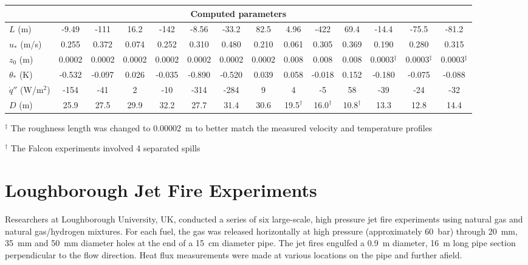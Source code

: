 \begin{table}
\begin{center}
\begin{tabular}{|l|c|c|c|c|c|c|c|c|c|c|c|c|c|}
\multicolumn{14}{|c|}{Computed parameters} \\ \hline
$L$ (m)                        & -9.49  & -111   & 16.2   & -142   & -8.56  & -33.2  & 82.5        & 4.96        & -422        & 69.4              & -14.4           & -75.5          & -81.2   \\ \hline
$u_*$ (m/s)                    & 0.255  & 0.372  & 0.074  & 0.252  & 0.310  & 0.480  & 0.210       & 0.061       & 0.305       & 0.369             & 0.190           & 0.280          & 0.315   \\ \hline
$z_0$ (m)                      & 0.0002 & 0.0002 & 0.0002 & 0.0002 & 0.0002 & 0.0002 & 0.0002      & 0.008       & 0.008       & 0.008             & 0.0003$^\ddag$  & 0.0003$^\ddag$ & 0.0003$^\ddag$  \\ \hline
$\theta_*$ (K)                 & -0.532 & -0.097 & 0.026  & -0.035 & -0.890 & -0.520 & 0.039       & 0.058       & -0.018      & 0.152             & -0.180          & -0.075         & -0.088  \\ \hline
$\dot{q}''$ (W/m$^2$)          & -154   & -41    & 2      & -10    & -314   & -284   & 9           & 4           & -5          & 58                & -39             & -24            & -32     \\ \hline
$D$ (m)                        & 25.9   & 27.5   & 29.9   & 32.2   & 27.7   & 31.4   & 30.6        & 19.5$^\dag$ & 16.0$^\dag$ & 10.8$^\dag$       & 13.3            & 12.8           & 14.4    \\ \hline
\end{tabular}
\end{center}
$^\ddag$ The roughness length was changed to 0.00002~m to better match the measured velocity and temperature profiles

$^\dag$ The Falcon experiments involved 4 separated spills
\label{tab:LNG_Dispersion}
\end{table}



\section{Loughborough Jet Fire Experiments}
\label{Loughborough_Jet_Fires_Description}

Researchers at Loughborough University, UK, conducted a series of six large-scale, high pressure jet fire experiments using natural gas and natural gas/hydrogen mixtures. For each fuel, the gas was released horizontally at high pressure (approximately 60~bar) through 20~mm, 35~mm and 50~mm diameter holes at the end of a 15~cm diameter pipe. The jet fires engulfed a 0.9~m diameter, 16~m long pipe section perpendicular to the flow direction. Heat flux measurements were made at various locations on the pipe and further afield. 

